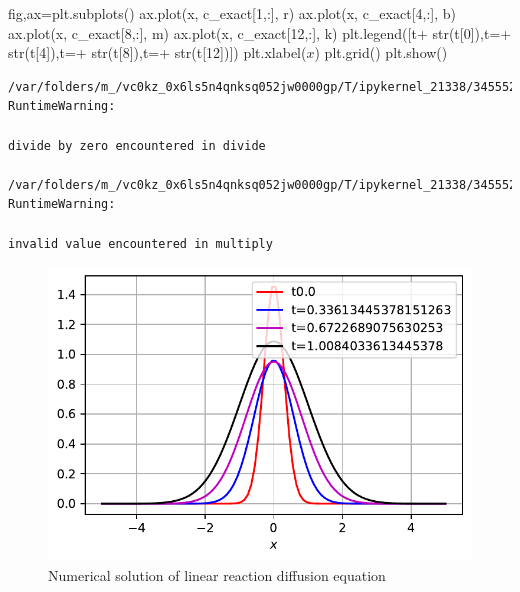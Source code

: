 \documentclass[
  letterpaper,
  DIV=11,
  numbers=noendperiod]{scrreprt}
\newenvironment{Shaded}{\begin{snugshade}}{\end{snugshade}}
\newcommand{\BuiltInTok}[1]{\textcolor[rgb]{0.00,0.23,0.31}{#1}}
\newcommand{\DecValTok}[1]{\textcolor[rgb]{0.68,0.00,0.00}{#1}}
\newcommand{\NormalTok}[1]{\textcolor[rgb]{0.00,0.23,0.31}{#1}}
\newcommand{\OperatorTok}[1]{\textcolor[rgb]{0.37,0.37,0.37}{#1}}
\newcommand{\StringTok}[1]{\textcolor[rgb]{0.13,0.47,0.30}{#1}}
\theoremstyle{plain}
\theoremstyle{definition}
\theoremstyle{plain}
\theoremstyle{remark}
\begin{document}
\begin{Shaded}
\begin{Highlighting}[]
\NormalTok{fig,ax}\OperatorTok{=}\NormalTok{plt.subplots()}
\NormalTok{ax.plot(x, c\_exact[}\DecValTok{1}\NormalTok{,:], }\StringTok{\textquotesingle{}r\textquotesingle{}}\NormalTok{)}
\NormalTok{ax.plot(x, c\_exact[}\DecValTok{4}\NormalTok{,:], }\StringTok{\textquotesingle{}b\textquotesingle{}}\NormalTok{)}
\NormalTok{ax.plot(x, c\_exact[}\DecValTok{8}\NormalTok{,:], }\StringTok{\textquotesingle{}m\textquotesingle{}}\NormalTok{)}
\NormalTok{ax.plot(x, c\_exact[}\DecValTok{12}\NormalTok{,:], }\StringTok{\textquotesingle{}k\textquotesingle{}}\NormalTok{)}
\NormalTok{plt.legend([}\StringTok{\textquotesingle{}t\textquotesingle{}}\OperatorTok{+} \BuiltInTok{str}\NormalTok{(t[}\DecValTok{0}\NormalTok{]),}\StringTok{\textquotesingle{}t=\textquotesingle{}}\OperatorTok{+} \BuiltInTok{str}\NormalTok{(t[}\DecValTok{4}\NormalTok{]),}\StringTok{\textquotesingle{}t=\textquotesingle{}}\OperatorTok{+} \BuiltInTok{str}\NormalTok{(t[}\DecValTok{8}\NormalTok{]),}\StringTok{\textquotesingle{}t=\textquotesingle{}}\OperatorTok{+} \BuiltInTok{str}\NormalTok{(t[}\DecValTok{12}\NormalTok{])])}
\NormalTok{plt.xlabel(}\StringTok{\textquotesingle{}$x$\textquotesingle{}}\NormalTok{)}
\NormalTok{plt.grid()}
\NormalTok{plt.show()}
\end{Highlighting}
\end{Shaded}

\begin{verbatim}
/var/folders/m_/vc0kz_0x6ls5n4qnksq052jw0000gp/T/ipykernel_21338/3455521560.py:46: RuntimeWarning:

divide by zero encountered in divide

/var/folders/m_/vc0kz_0x6ls5n4qnksq052jw0000gp/T/ipykernel_21338/3455521560.py:46: RuntimeWarning:

invalid value encountered in multiply
\end{verbatim}

\begin{figure}[H]

{\centering \includegraphics{linearreactiondiffusion_files/figure-pdf/fig-diffusionlinearsource-output-2.pdf}

}

\caption{\label{fig-diffusionlinearsource}Numerical solution of linear
reaction diffusion equation}

\end{figure}
\end{document}
